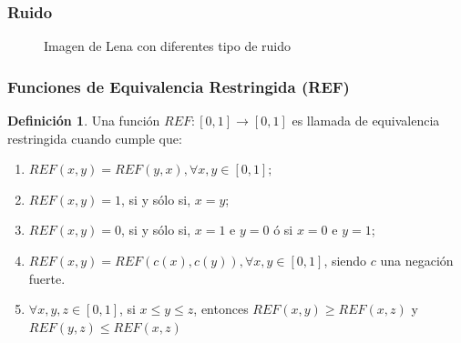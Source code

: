 \documentclass{beamer}
\theoremstyle{plain} %
\theoremstyle{definition}
\newtheorem{defn}{Definición}
\newcommand{\REV}[1]{{\color{red}\Large#1}}
\begin{document}
\begin{frame}
  \frametitle{Ruido}
  \begin{figure}
  \centering
      \quad
      \quad
      \caption{Imagen de Lena con diferentes tipo de ruido}
      \label{fig:defruido}
  \end{figure}
\end{frame}


\begin{frame}
  \frametitle{Funciones de Equivalencia Restringida (REF)}
  \begin{defn}\label{def:ref}
  Una función $REF  : [0, 1] \rightarrow [0, 1]$ es llamada de equivalencia restringida cuando cumple que:
    \begin{enumerate}
    \item $REF(x, y) = REF(y, x), \forall x, y \in [0, 1];$
    \item $REF(x, y) = 1$, si y sólo si, $x=y$;
    \item $REF(x, y) = 0$, si y sólo si, $x=1$ e $y=0$ ó si $x=0$ e $y=1$;
    \item $REF(x, y) = REF(c(x), c(y)),  \forall x, y \in [0, 1]$, siendo $c$ una negación fuerte.
    \item $\forall x, y, z \in [0, 1]$, si $x\leq y\leq z$, entonces $REF(x, y)\geq REF(x, z)$ y  $REF(y, z)\leq REF(x, z)$
    \end{enumerate}
  \end{defn}
\end{frame}
\end{document}
